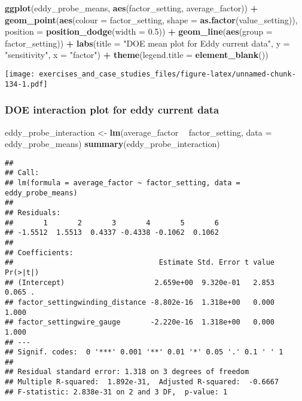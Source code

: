 \documentclass[]{book}
\newenvironment{Shaded}{\begin{snugshade}}{\end{snugshade}}
\newcommand{\DataTypeTok}[1]{\textcolor[rgb]{0.13,0.29,0.53}{#1}}
\newcommand{\FloatTok}[1]{\textcolor[rgb]{0.00,0.00,0.81}{#1}}
\newcommand{\KeywordTok}[1]{\textcolor[rgb]{0.13,0.29,0.53}{\textbf{#1}}}
\newcommand{\NormalTok}[1]{#1}
\newcommand{\OperatorTok}[1]{\textcolor[rgb]{0.81,0.36,0.00}{\textbf{#1}}}
\newcommand{\StringTok}[1]{\textcolor[rgb]{0.31,0.60,0.02}{#1}}
\theoremstyle{definition}
\theoremstyle{definition}
\theoremstyle{definition}
\theoremstyle{remark}
\begin{document}
\begin{Shaded}
\begin{Highlighting}[]
\KeywordTok{ggplot}\NormalTok{(eddy_probe_means, }\KeywordTok{aes}\NormalTok{(factor_setting, average_factor)) }\OperatorTok{+}
\StringTok{  }\KeywordTok{geom_point}\NormalTok{(}\KeywordTok{aes}\NormalTok{(}\DataTypeTok{colour =}\NormalTok{ factor_setting, }\DataTypeTok{shape =} \KeywordTok{as.factor}\NormalTok{(value_setting)), }\DataTypeTok{position =} \KeywordTok{position_dodge}\NormalTok{(}\DataTypeTok{width =} \FloatTok{0.5}\NormalTok{)) }\OperatorTok{+}
\StringTok{  }\KeywordTok{geom_line}\NormalTok{(}\KeywordTok{aes}\NormalTok{(}\DataTypeTok{group =}\NormalTok{ factor_setting)) }\OperatorTok{+}
\StringTok{  }\KeywordTok{labs}\NormalTok{(}\DataTypeTok{title =} \StringTok{"DOE mean plot for Eddy current data"}\NormalTok{, }\DataTypeTok{y =} \StringTok{"sensitivity"}\NormalTok{, }\DataTypeTok{x =} \StringTok{"factor"}\NormalTok{) }\OperatorTok{+}
\StringTok{  }\KeywordTok{theme}\NormalTok{(}\DataTypeTok{legend.title =} \KeywordTok{element_blank}\NormalTok{())}
\end{Highlighting}
\end{Shaded}

\texttt{[image: exercises\_and\_case\_studies\_files/figure-latex/unnamed-chunk-134-1.pdf]}

\hypertarget{doe-interaction-plot-for-eddy-current-data}{%
\subsubsection{DOE interaction plot for eddy current
data}\label{doe-interaction-plot-for-eddy-current-data}}

\begin{Shaded}
\begin{Highlighting}[]
\NormalTok{eddy_probe_interaction <-}\StringTok{ }\KeywordTok{lm}\NormalTok{(average_factor }\OperatorTok{~}\StringTok{ }\NormalTok{factor_setting, }\DataTypeTok{data =}\NormalTok{ eddy_probe_means)}
\KeywordTok{summary}\NormalTok{(eddy_probe_interaction)}
\end{Highlighting}
\end{Shaded}

\begin{verbatim}
## 
## Call:
## lm(formula = average_factor ~ factor_setting, data = eddy_probe_means)
## 
## Residuals:
##       1       2       3       4       5       6 
## -1.5512  1.5513  0.4337 -0.4338 -0.1062  0.1062 
## 
## Coefficients:
##                                  Estimate Std. Error t value Pr(>|t|)  
## (Intercept)                     2.659e+00  9.320e-01   2.853    0.065 .
## factor_settingwinding_distance -8.802e-16  1.318e+00   0.000    1.000  
## factor_settingwire_gauge       -2.220e-16  1.318e+00   0.000    1.000  
## ---
## Signif. codes:  0 '***' 0.001 '**' 0.01 '*' 0.05 '.' 0.1 ' ' 1
## 
## Residual standard error: 1.318 on 3 degrees of freedom
## Multiple R-squared:  1.892e-31,  Adjusted R-squared:  -0.6667 
## F-statistic: 2.838e-31 on 2 and 3 DF,  p-value: 1
\end{verbatim}
\end{document}

